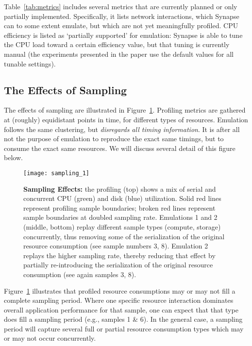 \documentclass[10pt, conference, compsocconf]{IEEEtran}
\newcommand{\I}[1]{\textit{#1}\xspace}
\newcommand{\synapse}{Synapse\xspace}
\begin{document}
 Table~\ref{tab:metrics} includes several metrics that are currently
 planned or only partially implemented.  Specifically, it lists
 network interactions, which \synapse can to some extent emulate, but
 which are not yet meaningfully profiled.  
CPU efficiency is listed as `partially supported' for emulation:
 \synapse is able to tune the CPU load toward a certain efficiency
 value, but that tuning is currently manual (the experiments presented
 in the paper use the default values for all tunable settings).


 \subsection{The Effects of Sampling}
 \label{sec:sampling}

  The effects of sampling are illustrated in
  Figure~\ref{fig:sampling_1}.  Profiling metrics are gathered at
  (roughly) equidistant points in time, for different types of
  resources.  Emulation follows the same clustering, but \I{disregards
  all timing information}.  It is after all not the purpose of
  emulation to reproduce the exact same timings, but to consume the
  exact same resources.  We will discuss several detail of this figure
  below.

  \begin{figure}[b]
   \centering
   \texttt{[image: sampling\_1]}
   \caption{\textbf{Sampling Effects:} the profiling (top) shows
     a mix of serial and concurrent CPU (green) and disk (blue)
     utilization.  Solid red lines represent profiling sample
     boundaries; broken red lines represent sample boundaries at
     doubled sampling rate.  Emulations 1 and 2 (middle, bottom)
     replay different sample types (compute, storage) concurrently,
     thus removing some of the serialization of the original resource
     consumption (see sample numbers 3, 8).  Emulation 2 replays the
     higher sampling rate, thereby reducing that effect by partially
     re-introducing the serialization of the original resource
     consumption (see again samples 3, 8).
     \label{fig:sampling_1} 
     } 
  \end{figure}

  Figure~\ref{fig:sampling_1} illustrates that profiled resource
  consumptions may or may not fill a complete sampling period.  Where
  one specific resource interaction dominates overall application
  performance for that sample, one can expect that that type does fill
  a sampling period (e.g., samples 1 \& 6).  In the general case,
  a sampling period will capture several full or partial resource
  consumption types which may or may not occur concurrently.
\end{document}
